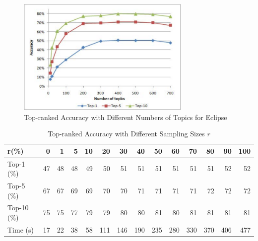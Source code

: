 \begin{figure}[t]
\centering
\includegraphics[width=3.3in]{sensitive}
\caption{Top-ranked Accuracy with Different Numbers of Topics for Eclipse}
\label{sensitive}
\end{figure}


\begin{table}[t]
\centering
\caption{Top-ranked Accuracy with Different Sampling Sizes $r$}
\setlength{\tabcolsep}{2.5pt}
\begin{tabular}{|l||r|r|r|r|r|r|r|r|r|r|r|r|r|}
\hline
   r(\%) & 0 & 1 & 5 & 10 & 20 & 30 & 40 & 50 & 60 & 70 & 80 & 90 & 100\\
\hline
   Top-1 (\%) & 47 & 48 & 48 & 49 & 50 & 51 & 51 & 51 & 51 & 51 & 51 & 52 & 52\\
   Top-5 (\%) & 67 & 67 & 69 & 69 & 70 & 70 & 71 & 71 & 71 & 71 & 72 & 72 & 72\\
   Top-10 (\%) & 75 & 75 & 77 & 79 & 79 & 80 & 80 & 81 & 80 & 81 & 81 & 81 & 81\\
\hline
   Time (s) & 17 & 22 & 38 & 58 & 111 & 146 & 190 & 235 & 280 & 330 & 370 & 406 & 477\\
\hline
\end{tabular}
\label{tradeoff}
\end{table}

